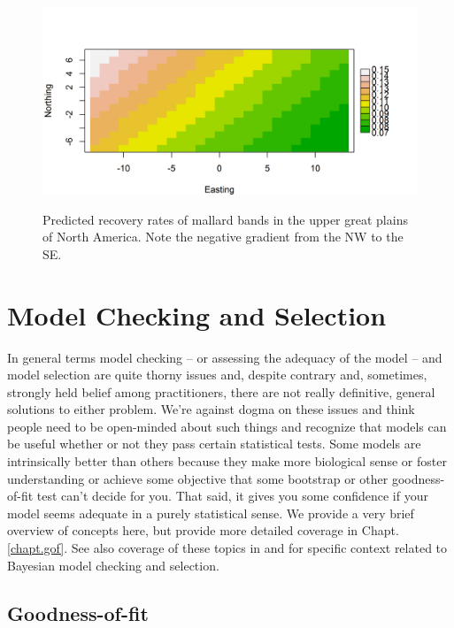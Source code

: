 {{{\begin{figure}
\begin{center}
\includegraphics[height=2.5in]{Ch2-Bayes/figs/mallard_gradient}
\end{center}
\caption{Predicted recovery rates of mallard bands in the upper great
  plains of North America. Note the negative gradient from the NW to
  the SE.}
\label{glms.fig.bandrecovery}
\end{figure}

\section{Model Checking and Selection}
\label{glms.sec.modsel}

In general terms model checking -- or assessing the adequacy of the
model -- and model selection are quite thorny issues and, despite
contrary and, sometimes, strongly held belief among practitioners, there are not
really definitive, general solutions to either problem. We're against
dogma on these issues and think people need to be open-minded about
such things and recognize that models can be useful whether or not
they pass certain statistical tests. Some models are intrinsically
better than others because they make more biological sense or foster
understanding or achieve some objective that some  bootstrap
or other goodness-of-fit test can't decide for you. That said, it
gives you some confidence if your model seems adequate in a purely statistical
sense.
We provide a very brief overview of concepts here, but provide more
detailed coverage in Chapt. \ref{chapt.gof}.
See also coverage of these topics in
\citet[][]{kery:2010} and
\citet[][]{link_barker:2010}
for specific context related to Bayesian
model checking and selection.

\subsection{Goodness-of-fit}
\label{glms.sec.gof}

}}}
